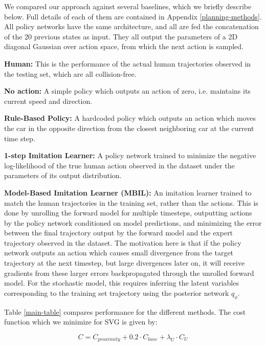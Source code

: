 \documentclass{article} %
\begin{document}
    We compared our approach against several baselines, which we briefly describe below. Full details of each of them are contained in Appendix \ref{planning-methods}.
    All policy networks have the same architecture, and all are fed the concatenation of the 20 previous states as input. They all output the parameters of a 2D diagonal Gaussian over action space, from which the next action is sampled.

    \textbf{Human:} This is the performance of the actual human trajectories observed in the testing set, which are all collision-free.

    \textbf{No action:} A simple policy which outputs an action of zero, i.e. maintains its current speed and direction.

    \textbf{Rule-Based Policy:} A hardcoded policy which outputs an action which moves the car in the opposite direction from the closest neighboring car at the current time step.

    \textbf{1-step Imitation Learner:} A policy network trained to minimize the negative log-likelihood of the true human action observed in the dataset under the parameters of its output distribution.

    \textbf{Model-Based Imitation Learner (MBIL):} An imitation learner trained to match the human trajectories in the training set, rather than the actions.
  This is done by unrolling the forward model for multiple timesteps, outputting actions by the policy network conditioned on model predictions, and minimizing the error between the final trajectory output by the forward model and the expert trajectory observed in the dataset.
  The motivation here is that if the policy network outputs an action which causes small divergence from the target trajectory at the next timestep, but large divergences later on, it will receive gradients from these larger errors backpropagated through the unrolled forward model. For the stochastic model, this requires inferring the latent variables corresponding to the training set trajectory using the posterior network $q_\phi$.





    Table \ref{main-table} compares performance for the different methods.
    The cost function which we minimize for SVG is given by:

    \begin{equation}
      C = C_{proximity} + 0.2 \cdot C_{lane} + \lambda_U \cdot C_U
    \end{equation}
\end{document}
